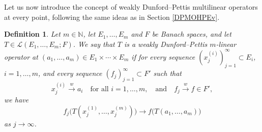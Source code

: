 \documentclass[12 pt]{article}%
\newtheorem{proposition}[theorem]{Proposition}
\newtheorem{final remark}[theorem]{Final Remark}
\newtheorem{definition}[theorem]{Definition}
\begin{document}
%

Let us now introduce the concept of weakly Dunford–Pettis multilinear operators at every point, following the same ideas as in Section \ref{DPMOHPEv}.

\begin{definition}\label{WDPML}
	Let $m \in \mathbb{N}$, let $E_1,\dots,E_m$ and $F$ be Banach spaces, and let $T \in \mathcal{L}(E_1,\dots,E_m;F)$. We say that $T$ is a weakly Dunford–Pettis $m$-linear operator at $(a_1,\dots,a_m) \in E_1 \times \cdots \times E_m$ if for every sequence $(x_j^{(i)})_{j=1}^{\infty} \subset E_i$, $i=1,\dots,m$, and every sequence $(f_j)_{j=1}^{\infty} \subset F'$ such that
	\[
	x_j^{(i)} \overset{w}{\longrightarrow} a_i \quad \text{for all } i=1,\dots,m,
	\quad \text{and} \quad
	f_j \overset{w}{\longrightarrow} f \in F',
	\]
	we have
	\[
	f_j\big(T(x_j^{(1)},\dots,x_j^{(m)})\big)
	\longrightarrow
	f\big(T(a_1,\dots,a_m)\big)
	\]
	as $j \to \infty$.
\end{definition}
\end{document}
